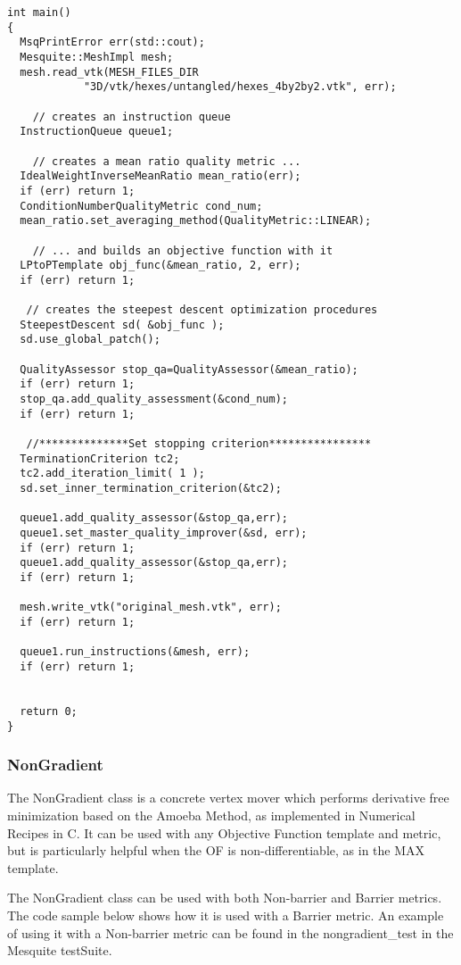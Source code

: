 \begin{lstlisting}[frame=single]
int main()
{
  MsqPrintError err(std::cout);
  Mesquite::MeshImpl mesh;
  mesh.read_vtk(MESH_FILES_DIR 
            "3D/vtk/hexes/untangled/hexes_4by2by2.vtk", err);
  
    // creates an instruction queue
  InstructionQueue queue1;
  
    // creates a mean ratio quality metric ...
  IdealWeightInverseMeanRatio mean_ratio(err);
  if (err) return 1;
  ConditionNumberQualityMetric cond_num;
  mean_ratio.set_averaging_method(QualityMetric::LINEAR);
  
    // ... and builds an objective function with it
  LPtoPTemplate obj_func(&mean_ratio, 2, err);
  if (err) return 1;

   // creates the steepest descent optimization procedures
  SteepestDescent sd( &obj_func );
  sd.use_global_patch();
  
  QualityAssessor stop_qa=QualityAssessor(&mean_ratio);
  if (err) return 1;
  stop_qa.add_quality_assessment(&cond_num);
  if (err) return 1;
    
   //**************Set stopping criterion****************
  TerminationCriterion tc2;
  tc2.add_iteration_limit( 1 );
  sd.set_inner_termination_criterion(&tc2);

  queue1.add_quality_assessor(&stop_qa,err);
  queue1.set_master_quality_improver(&sd, err); 
  if (err) return 1;
  queue1.add_quality_assessor(&stop_qa,err);
  if (err) return 1;

  mesh.write_vtk("original_mesh.vtk", err); 
  if (err) return 1;
  
  queue1.run_instructions(&mesh, err);
  if (err) return 1;
  

  return 0;
}
\end{lstlisting}

\subsubsection{NonGradient}
The NonGradient class is a concrete vertex mover which performs derivative free minimization based on the Amoeba Method, as implemented in Numerical Recipes in C.  It can be used with any Objective Function template and metric, but is particularly helpful when the OF is non-differentiable, as in the MAX template.

The NonGradient class can be used with both Non-barrier and Barrier metrics. The code sample below shows how it is used with a Barrier metric.  An example of using it with a Non-barrier metric can be found in the nongradient\_test in the Mesquite testSuite.

